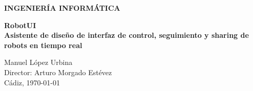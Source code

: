 \begin{titlepage}
\begin{center}
    \Large{\textbf{INGENIERÍA INFORMÁTICA}} \\

    \vspace{3.0cm}

    \Large{\textbf{RobotUI\\ Asistente de diseño de interfaz de control, seguimiento y sharing de robots en tiempo real }} \\

    \vspace{3.0cm}

    \normalsize{Manuel López Urbina \\
    Director: Arturo Morgado Estévez }\\

    \vspace{1.5cm}
    Cádiz, \today

  \end{center}
\end{titlepage}


